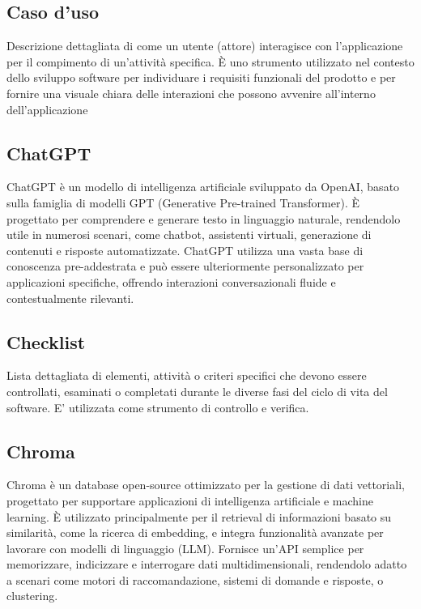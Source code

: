\hypertarget{sec:caso_uso}{}
\subsection*{Caso d'uso}
Descrizione dettagliata di come un utente (attore) interagisce con l'applicazione per il compimento di un'attività specifica. È uno strumento utilizzato nel 
contesto dello sviluppo software per individuare i requisiti funzionali del prodotto e per fornire una visuale chiara delle interazioni che possono avvenire 
all'interno dell'applicazione

\hypertarget{sec:chatgpt}{}
\subsection*{ChatGPT}
ChatGPT è un modello di intelligenza artificiale sviluppato da OpenAI, basato sulla famiglia di modelli GPT (Generative Pre-trained Transformer). 
È progettato per comprendere e generare testo in linguaggio naturale, rendendolo utile in numerosi scenari, come chatbot, assistenti virtuali, generazione 
di contenuti e risposte automatizzate. ChatGPT utilizza una vasta base di conoscenza pre-addestrata e può essere ulteriormente personalizzato per 
applicazioni specifiche, offrendo interazioni conversazionali fluide e contestualmente rilevanti.

\subsection*{Checklist}
Lista dettagliata di elementi, attività o criteri specifici che devono essere controllati, esaminati o completati durante le diverse fasi del ciclo di vita 
del software. E' utilizzata come strumento di controllo e verifica.

\hypertarget{sec:chroma}{}
\subsection*{Chroma}
Chroma è un database open-source ottimizzato per la gestione di dati vettoriali, progettato per supportare applicazioni di intelligenza artificiale e 
machine learning. È utilizzato principalmente per il retrieval di informazioni basato su similarità, come la ricerca di embedding, e integra funzionalità 
avanzate per lavorare con modelli di linguaggio (LLM). Fornisce un'API semplice per memorizzare, indicizzare e interrogare dati multidimensionali, 
rendendolo adatto a scenari come motori di raccomandazione, sistemi di domande e risposte, o clustering.

